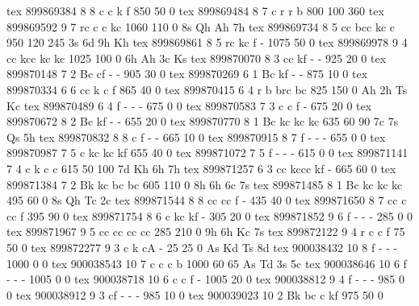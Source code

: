 tex       899869384  8  8 c   c     k     f          850   50    0 
tex       899869484  8  7 c   r     r     b          800  100  360 
tex       899869592  9  7 rc  c     c     kc        1060  110    0 8s Qh Ah 7h
tex       899869734  8  5 cc  bcc   kc    c          950  120  245 3s 6d 9h Kh
tex       899869861  8  5 rc  kc    f     -         1075   50    0 
tex       899869978  9  4 cc  kcc   kc    kc        1025  100    0 6h Ah 3c Ks
tex       899870070  8  3 cc  kf    -     -          925   20    0 
tex       899870148  7  2 Bc  cf    -     -          905   30    0 
tex       899870269  6  1 Bc  kf    -     -          875   10    0 
tex       899870334  6  6 cc  k     c     f          865   40    0 
tex       899870415  6  4 r   b     brc   bc         825  150    0 Ah 2h Ts Kc
tex       899870489  6  4 f   -     -     -          675    0    0 
tex       899870583  7  3 c   c     f     -          675   20    0 
tex       899870672  8  2 Bc  kf    -     -          655   20    0 
tex       899870770  8  1 Bc  kc    kc    kc         635   60   90 7c 7s Qs 5h
tex       899870832  8  8 c   f     -     -          665   10    0 
tex       899870915  8  7 f   -     -     -          655    0    0 
tex       899870987  7  5 c   kc    kc    kf         655   40    0 
tex       899871072  7  5 f   -     -     -          615    0    0 
tex       899871141  7  4 c   k     c     c          615   50  100 7d Kh 6h 7h
tex       899871257  6  3 cc  kccc  kf    -          665   60    0 
tex       899871384  7  2 Bk  kc    bc    bc         605  110    0 8h 6h 6c 7s
tex       899871485  8  1 Bc  kc    kc    kc         495   60    0 8s Qh Tc 2c
tex       899871544  8  8 cc  cc    f     -          435   40    0 
tex       899871650  8  7 cc  c     cc    f          395   90    0 
tex       899871754  8  6 c   kc    kf    -          305   20    0 
tex       899871852  9  6 f   -     -     -          285    0    0 
tex       899871967  9  5 cc  cc    cc    cc         285  210    0 9h 6h Kc 7s
tex       899872122  9  4 r   c     c     f           75   50    0 
tex       899872277  9  3 c   k     cA    -           25   25    0 As Kd Ts 8d
tex       900038432 10  8 f   -     -     -         1000    0    0 
tex       900038543 10  7 c   c     c     b         1000   60   65 As Td 3s 5c
tex       900038646 10  6 f   -     -     -         1005    0    0 
tex       900038718 10  6 c   c     f     -         1005   20    0 
tex       900038812  9  4 f   -     -     -          985    0    0 
tex       900038912  9  3 cf  -     -     -          985   10    0 
tex       900039023 10  2 Bk  bc    c     kf         975   50    0 
